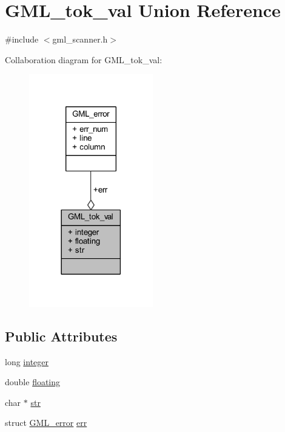 \hypertarget{union_g_m_l__tok__val}{}\section{G\+M\+L\+\_\+tok\+\_\+val Union Reference}
\label{union_g_m_l__tok__val}


{\ttfamily \#include $<$gml\+\_\+scanner.\+h$>$}



Collaboration diagram for G\+M\+L\+\_\+tok\+\_\+val\+:\nopagebreak
\begin{figure}[H]
\begin{center}
\leavevmode
\includegraphics[width=153pt]{union_g_m_l__tok__val__coll__graph}
\end{center}
\end{figure}
\subsection*{Public Attributes}
\begin{DoxyCompactItemize}
\item 
long \mbox{\hyperlink{union_g_m_l__tok__val_af96a245d02f0ac03aa40c34a91c3f656}{integer}}
\item 
double \mbox{\hyperlink{union_g_m_l__tok__val_a3684fb257807d1fe7f5ff0671de750cf}{floating}}
\item 
char $\ast$ \mbox{\hyperlink{union_g_m_l__tok__val_a219b67b798ce410d353be2cd01f73d0e}{str}}
\item 
struct \mbox{\hyperlink{struct_g_m_l__error}{G\+M\+L\+\_\+error}} \mbox{\hyperlink{union_g_m_l__tok__val_a4478d63e0be576766318a44868205536}{err}}
\end{DoxyCompactItemize}


